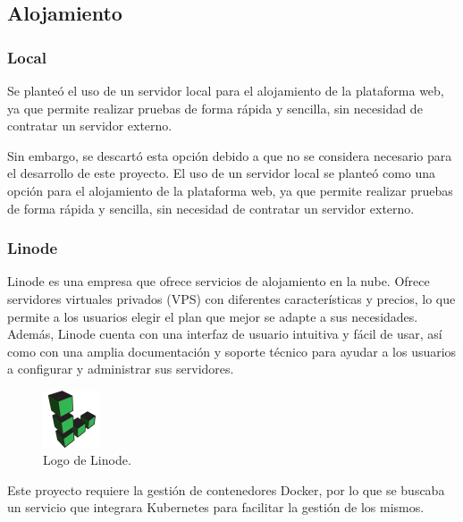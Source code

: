         \subsection{Alojamiento}

            \subsubsection{Local}

                Se planteó el uso de un servidor local para el alojamiento de la plataforma web, ya que permite realizar pruebas de forma rápida y sencilla, sin necesidad de contratar un servidor externo.

                Sin embargo, se descartó esta opción debido a que no se considera necesario para el desarrollo de este proyecto. El uso de un servidor local se planteó como una opción para el alojamiento de la plataforma web, ya que permite realizar pruebas de forma rápida y sencilla, sin necesidad de contratar un servidor externo.
                
            \subsubsection{Linode}

                Linode es una empresa que ofrece servicios de alojamiento en la nube. Ofrece servidores virtuales privados (VPS) con diferentes características y precios, lo que permite a los usuarios elegir el plan que mejor se adapte a sus necesidades. Además, Linode cuenta con una interfaz de usuario intuitiva y fácil de usar, así como con una amplia documentación y soporte técnico para ayudar a los usuarios a configurar y administrar sus servidores.

                \begin{figure}[htbp!]
                    \centering

                    \includegraphics[width=0.15\textwidth]{images/Logos/linode.png}
                    \caption{Logo de Linode.}

                    \label{fig:linode-logo}
                \end{figure}


                Este proyecto requiere la gestión de contenedores Docker, por lo que se buscaba un servicio que integrara Kubernetes para facilitar la gestión de los mismos.

